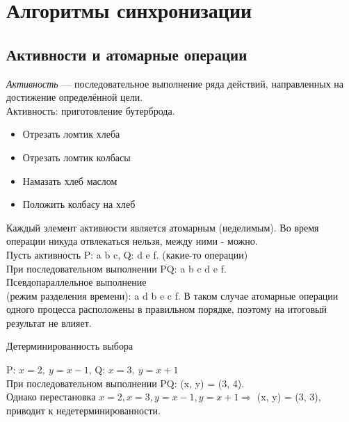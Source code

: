 \documentclass[12pt, a4paper]{article}
\begin{document}
    \section*{Алгоритмы синхронизации}
    \subsection*{Активности и атомарные операции}
    \textit{Активность} --- последовательное выполнение ряда действий, направленных на достижение определённой цели.\\
    Активность: приготовление бутерброда.
    \begin{itemize}
        \item Отрезать ломтик хлеба
        \item Отрезать ломтик колбасы
        \item Намазать хлеб маслом
        \item Положить колбасу на хлеб
    \end{itemize}
    Каждый элемент активности является атомарным (неделимым). Во время операции никуда отвлекаться нельзя, между ними - можно.\\
    Пусть активность P: a b c, Q: d e f. (какие-то операции)\\
    При последовательном выполнении PQ: a b c d e f.\\
    Псевдопараллельное выполнение\\
    (режим разделения времени): a d b e c f. В таком случае атомарные операции одного процесса расположены в правильном порядке, поэтому на итоговый результат не влияет.
    \begin{center}
        Детерминированность выбора
    \end{center}
    P: $x = 2,\ y = x - 1$, Q: $x = 3,\ y = x + 1$\\
    При последовательном выполнении PQ: (x, y) = (3, 4).\\
    Однако перестановка $x = 2, x = 3, y = x - 1, y = x + 1\Rightarrow$ (x, y) = (3, 3), приводит к недетерминированности.
\end{document}
